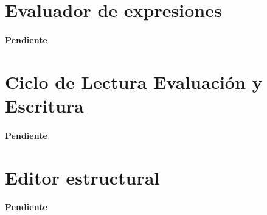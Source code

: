 \documentclass[letterpaper,twoside,openright,10pt]{book}
\begin{document}
\nwenddocs{}\section*{Evaluador de expresiones}

\paragraph{Pendiente}

\nwenddocs{}\section*{Ciclo de Lectura Evaluación y Escritura}

\paragraph{Pendiente}

\nwenddocs{}\section*{Editor estructural}

\paragraph{Pendiente}

\nwenddocs{}
\end{document}
